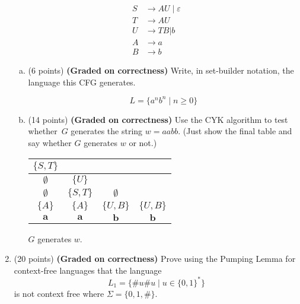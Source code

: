 \documentclass{article}
\theoremstyle{definition}
\newenvironment {solution}
{
\begin{tcolorbox}
}
{
\end{tcolorbox}
}
\begin{document}
\begin{enumerate}
    \begin{align*}
        S &\rightarrow AU \mid \varepsilon \\ 
        T &\rightarrow AU \\
        U &\rightarrow TB | b\\
        A &\rightarrow a \\
        B &\rightarrow b
    \end{align*}
    \begin{enumerate}[(a)]
        \item (6 points) \textbf{(Graded on correctness)} Write, in set-builder notation, the language this CFG generates.
        \begin{solution}
            \[L = \{a^n b^n \mid n \geq 0\}\]
        \end{solution}
        \item (14 points) \textbf{(Graded on correctness)} Use the CYK algorithm to test whether~$G$ generates the string $w = aabb$. (Just show the final table and say whether $G$ generates $w$ or not.) 
        \begin{solution}
            \begin{center}
                \begin{tabular}{|c|c|c|c|}
                    \hline
                    $\{{S, T}\}$ & & &  \\
                    \hline
                    $\emptyset$ & $\{{U}\}$ & & \\
                    \hline
                    $\emptyset$ & $\{{S, T}\}$ & $\emptyset$ &  \\
                    \hline
                    $\{{A}\}$ & $\{{A}\}$ & $\{{U, B}\}$ & $\{{U, B}\}$ \\
                    \hline
                    $\boldsymbol{a}$ & $\boldsymbol{a}$ & $\boldsymbol{b}$ & $\boldsymbol{b}$ \\
                    \hline
                \end{tabular}
            \end{center}
            $G$ generates $w$.
        \end{solution}
    \end{enumerate}
    \item (20 points) \textbf{(Graded on correctness)} Prove using the Pumping Lemma for context-free languages that the language
    \[
        L_1 = \{\#u\#u \mid u \in \{0, 1\}^*\}
    \]
    is not context free
    where $\Sigma = \{0, 1, \#\}$.
    

\end{enumerate}
\end{document}
